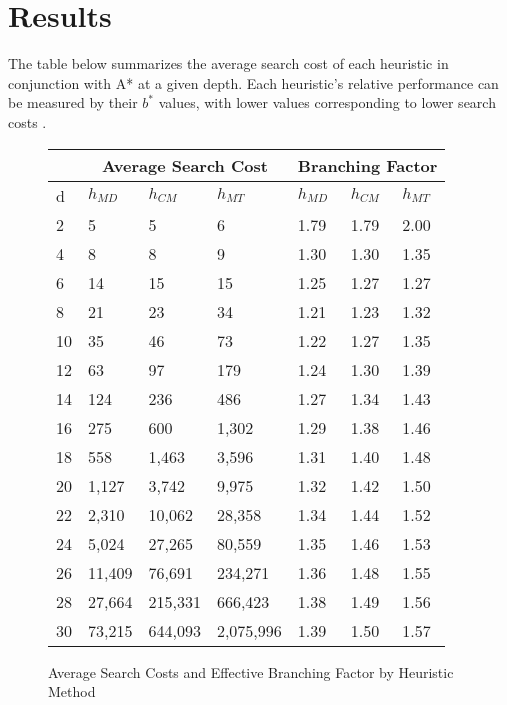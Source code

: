 
\section{Results}
\label{sec:results}

The table below summarizes the average search cost of each heuristic in conjunction with A* at a given depth. Each heuristic's relative performance can be measured by their $b^{*}$ values, with lower values corresponding to lower search costs \cite{aima}. \\

\begin{figure}[!ht]
    \centering
    
    \begin{tabular}{|l||l|l|l||l|l|l|}
    \hline
        & \multicolumn{3}{|c|}{Average Search Cost} &
           \multicolumn{3}{|c|}{Branching Factor} \\ \hline
        d & $h_{MD}$ & $h_{CM}$ & $h_{MT}$ & $h_{MD}$ & $h_{CM}$ & $h_{MT}$ \\ \hline
        2 & 5 & 5 & 6 & 1.79 & 1.79 & 2.00 \\ \hline
        4 & 8 & 8 & 9 & 1.30 & 1.30 & 1.35 \\ \hline
        6 & 14 & 15 & 15 & 1.25 & 1.27 & 1.27 \\ \hline
        8 & 21 & 23 & 34 & 1.21 & 1.23 & 1.32 \\ \hline
        10 & 35 & 46 & 73 & 1.22 & 1.27 & 1.35 \\ \hline
        12 & 63 & 97 & 179 & 1.24 & 1.30 & 1.39 \\ \hline
        14 & 124 & 236 & 486 & 1.27 & 1.34 & 1.43 \\ \hline
        16 & 275 & 600 & 1,302 & 1.29 & 1.38 & 1.46 \\ \hline
        18 & 558 & 1,463 & 3,596 & 1.31 & 1.40 & 1.48 \\ \hline
        20 & 1,127 & 3,742 & 9,975 & 1.32 & 1.42 & 1.50 \\ \hline
        22 & 2,310 & 10,062 & 28,358 & 1.34 & 1.44 & 1.52 \\ \hline
        24 & 5,024 & 27,265 & 80,559 & 1.35 & 1.46 & 1.53 \\ \hline
        26 & 11,409 & 76,691 & 234,271 & 1.36 & 1.48 & 1.55 \\ \hline
        28 & 27,664 & 215,331 & 666,423 & 1.38 & 1.49 & 1.56 \\ \hline
        30 & 73,215 & 644,093 & 2,075,996 & 1.39 & 1.50 & 1.57 \\ \hline
    \end{tabular}


    \caption{Average Search Costs and Effective Branching Factor by Heuristic Method}
\end{figure}


